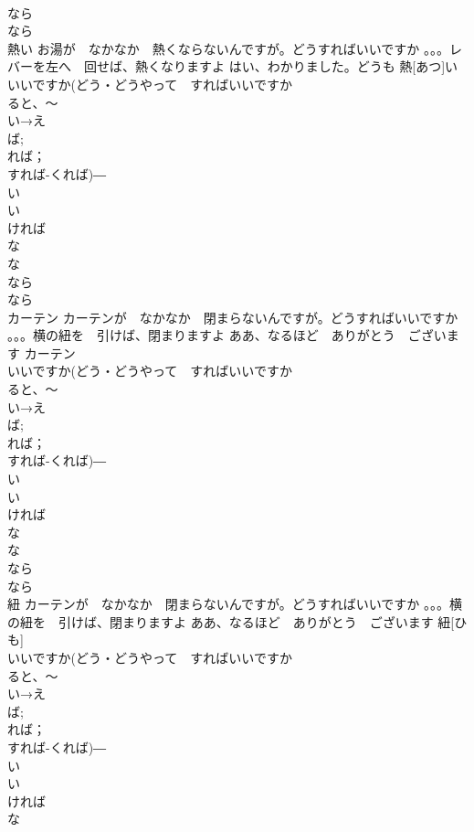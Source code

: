 \documentclass[8pt]{extreport}
\begin{document}
\begin{CJK}{UTF8}{min}
\\	なら　
\\	なら
\\	熱い	お湯が　なかなか　熱くならないんですが。どうすればいいですか 。。。レバーを左へ　回せば、熱くなりますよ はい、わかりました。どうも	熱[あつ]い			
\\	いいですか(どう・どうやって　すればいいですか　
\\	ると、～	
\\	い→え
\\	ば;
\\	れば；
\\	すれば-くれば)―　
\\	い
\\	い　
\\	ければ　
\\	な 
\\	な
\\	なら　
\\	なら
\\	カーテン	カーテンが　なかなか　閉まらないんですが。どうすればいいですか 。。。横の紐を　引けば、閉まりますよ ああ、なるほど　ありがとう　ございます	カーテン			
\\	いいですか(どう・どうやって　すればいいですか　
\\	ると、～		
\\	い→え
\\	ば;
\\	れば；
\\	すれば-くれば)―　
\\	い
\\	い　
\\	ければ　
\\	な 
\\	な
\\	なら　
\\	なら
\\	紐	カーテンが　なかなか　閉まらないんですが。どうすればいいですか 。。。横の紐を　引けば、閉まりますよ ああ、なるほど　ありがとう　ございます	紐[ひも]			
\\	いいですか(どう・どうやって　すればいいですか　
\\	ると、～	
\\	い→え
\\	ば;
\\	れば；
\\	すれば-くれば)―　
\\	い
\\	い　
\\	ければ　
\\	な 

\end{CJK}
\end{document}
